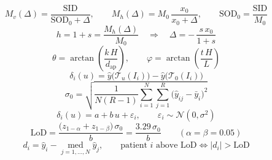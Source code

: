 \documentclass{article}
\begin{document}
\begin{equation}
M_v(\Delta)=\frac{\mathrm{SID}}{\mathrm{SOD}_0+\Delta},\qquad M_h(\Delta)=M_0\,\frac{x_0}{x_0+\Delta},\qquad \mathrm{SOD}_0=\frac{\mathrm{SID}}{M_0}
\end{equation}
\begin{equation}
h=1+s=\frac{M_h(\Delta)}{M_0}\quad\Longrightarrow\quad \Delta=-\,\frac{s\,x_0}{1+s}
\end{equation}
\begin{equation}
\theta=\arctan\!\left(\frac{k\,H}{d_{\mathrm{ap}}}\right),\qquad \varphi=\arctan\!\left(\frac{t\,H}{L}\right)
\end{equation}
\begin{equation}
\delta_{i}(u)=\hat{y}\big(\mathcal{T}_{u}(I_i)\big)-\hat{y}\big(\mathcal{T}_{0}(I_i)\big)
\end{equation}
\begin{equation}
\sigma_0=\sqrt{\frac{1}{N(R-1)}\sum_{i=1}^{N}\sum_{j=1}^{R}\big(\hat{y}_{ij}-\bar{y}_{i}\big)^{2}}
\end{equation}
\begin{equation}
\delta_{i}(u)=a+b\,u+\varepsilon_{i},\qquad \varepsilon_i\sim\mathcal{N}(0,\sigma^2)
\end{equation}
\begin{equation}
\mathrm{LoD}=\frac{\big(z_{1-\alpha}+z_{1-\beta}\big)\,\sigma_0}{b}=\frac{3.29\,\sigma_0}{b}\qquad(\alpha=\beta=0.05)
\end{equation}
\begin{equation}
d_i=\hat{y}_i-\operatorname*{med}_{j=1,\dots,N}\hat{y}_j,\qquad \text{patient } i \text{ above LoD} \iff |d_i|>\mathrm{LoD}
\end{equation}
\end{document}
